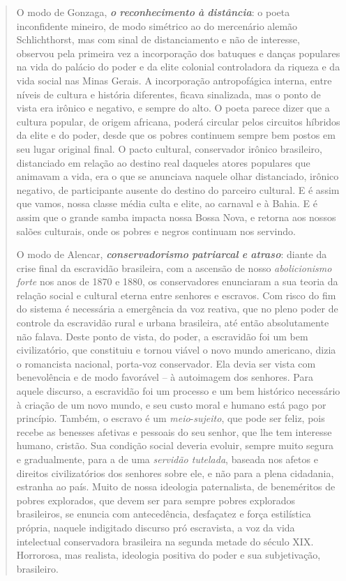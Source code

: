 \begin{quote}
O modo de Gonzaga, \emph{\textbf{o} \textbf{reconhecimento} \textbf{à}
\textbf{distância}}: o poeta inconfidente mineiro, de modo simétrico ao
do mercenário alemão Schlichthorst, mas com sinal de distanciamento e
não de interesse, observou pela primeira vez a incorporação dos batuques
e danças populares na vida do palácio do poder e da elite colonial
controladora da riqueza e da vida social nas Minas Gerais. A
incorporação antropofágica interna, entre níveis de cultura e história
diferentes, ficava sinalizada, mas o ponto de vista era irônico e
negativo, e sempre do alto. O poeta parece dizer que a cultura popular,
de origem africana, poderá circular pelos circuitos híbridos da elite e
do poder, desde que os pobres continuem sempre bem postos em seu lugar
original final. O pacto cultural, conservador irônico brasileiro,
distanciado em relação ao destino real daqueles atores populares que
animavam a vida, era o que se anunciava naquele olhar distanciado,
irônico negativo, de participante ausente do destino do parceiro
cultural. E é assim que vamos, nossa classe média culta e elite, ao
carnaval e à Bahia. E é assim que o grande samba impacta nossa Bossa
Nova, e retorna aos nossos salões culturais, onde os pobres e negros
continuam nos servindo.

O modo de Alencar, \emph{\textbf{conservadorismo} \textbf{patriarcal}
\textbf{e} \textbf{atraso}}: diante da crise final da escravidão
brasileira, com a ascensão de nosso \emph{abolicionismo forte} nos anos
de 1870 e 1880, os conservadores enunciaram a sua teoria da relação
social e cultural eterna entre senhores e escravos. Com risco do fim do
sistema é necessária a emergência da voz reativa, que no pleno poder de
controle da escravidão rural e urbana brasileira, até então
absolutamente não falava. Deste ponto de vista, do poder, a escravidão
foi um bem civilizatório, que constituiu e tornou viável o novo mundo
americano, dizia o romancista nacional, porta-voz conservador. Ela devia
ser vista com benevolência e de modo favorável -- à autoimagem dos
senhores. Para aquele discurso, a escravidão foi um processo e um bem
histórico necessário à criação de um novo mundo, e seu custo moral e
humano está pago por princípio. Também, o escravo é um
\emph{meio}-\emph{sujeito}, que pode ser feliz, pois recebe as benesses
afetivas e pessoais do seu senhor, que lhe tem interesse humano,
cristão. Sua condição social deveria evoluir, sempre muito segura e
gradualmente, para a de uma \emph{servidão tutelada}, baseada nos afetos
e direitos civilizatórios dos senhores sobre ele, e não para a plena
cidadania, estranha ao país. Muito de nossa ideologia paternalista, de
beneméritos de pobres explorados, que devem ser para sempre pobres
explorados brasileiros, se enuncia com antecedência, desfaçatez e força
estilística própria, naquele indigitado discurso pró escravista, a voz
da vida intelectual conservadora brasileira na segunda metade do século
XIX. Horrorosa, mas realista, ideologia positiva do poder e sua
subjetivação, brasileiro.


\end{quote}
